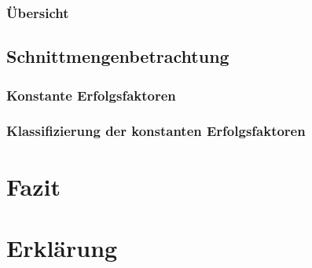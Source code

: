 \documentclass[12pt,a4paper,oneside]{article}
\newcommand{\EF}{Erfolgsfaktoren }
\begin{document}





























\subsubsection{Übersicht}

\subsection{Schnittmengenbetrachtung}
\subsubsection{Konstante \EF}
\subsubsection{Klassifizierung der konstanten \EF}

\section{Fazit}

\clearpage
{}
{}
\printbibliography[title=Literaturverzeichnis]

\clearpage
{}
{}
\section*{Erklärung}

\end{document}
